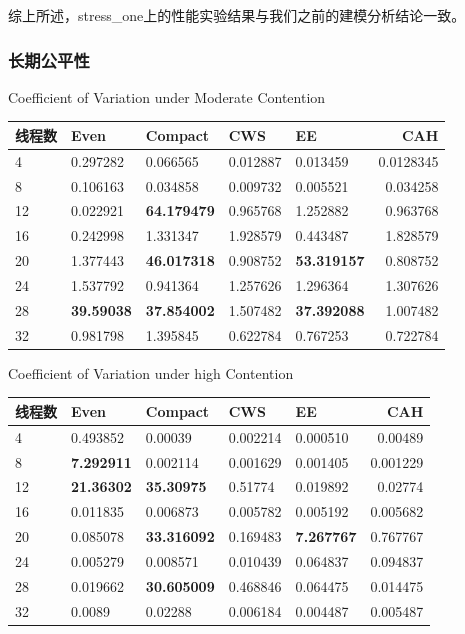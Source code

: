 综上所述，stress\_one上的性能实验结果与我们之前的建模分析结论一致。

\subsubsection{长期公平性}

\begin{table}[!hpb]
  \centering
    {Coefficient of Variation under Moderate Contention}
  \label{tab:CV-Moderate}
  \begin{tabular}{@{}lllllr@{}} \toprule
    线程数 & Even & Compact & CWS & EE & CAH \\ \midrule
    4	& 0.297282	& 0.066565	& 0.012887	& 0.013459	& 0.0128345 \\
    8	& 0.106163	& 0.034858	& 0.009732	& 0.005521	& 0.034258 \\
    12	& 0.022921	& {\bf 64.179479}	& 0.965768	& 1.252882	& 0.963768 \\
    16	& 0.242998	& 1.331347	& 1.928579	& 0.443487	& 1.828579 \\
    20	& 1.377443	& {\bf 46.017318}	& 0.908752	& {\bf \color{red}53.319157}	& 0.808752 \\
    24	& 1.537792	& 0.941364	& 1.257626	& 1.296364	& 1.307626 \\
    28	& {\bf \color{red}39.59038}	& {\bf 37.854002}	& 1.507482	& {\bf \color{red}37.392088}	& 1.007482 \\
    32	& 0.981798	& 1.395845	& 0.622784	& 0.767253	& 0.722784 \\
  \end{tabular}
\end{table}

\begin{table}[!hpb]
  \centering
    {Coefficient of Variation under high Contention}
  \label{tab:CV-High}
  \begin{tabular}{@{}lllllr@{}} \toprule
    线程数 & Even & Compact & CWS & EE & CAH \\ \midrule
    4	& 0.493852	& 0.00039	& 0.002214	& 0.000510	& 0.00489 \\
    8	& {\bf \color{red}7.292911}	& 0.002114	& 0.001629	& 0.001405	& 0.001229 \\
    12	& {\bf \color{red}21.36302}	& {\bf 35.30975}	& 0.51774	& 0.019892	& 0.02774 \\
    16	& 0.011835	& 0.006873	& 0.005782	& 0.005192	& 0.005682 \\
    20	& 0.085078	& {\bf33.316092}	& 0.169483	& {\bf \color{red}7.267767}	& 0.767767 \\
    24	& 0.005279	& 0.008571	& 0.010439	& 0.064837	& 0.094837 \\
    28	& 0.019662	& {\bf 30.605009}	& 0.468846	& 0.064475	& 0.014475 \\
    32	& 0.0089	& 0.02288	& 0.006184	& 0.004487	& 0.005487 \\

  \end{tabular}
\end{table}

